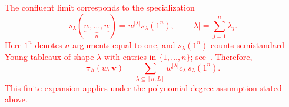 \documentclass[a4paper,11pt]{amsart}
\begin{document}
\textcolor{red}{The confluent limit corresponds to the specialization
\begin{equation}
  s_\lambda(\underbrace{w,\ldots,w}_{n})
  = w^{|\lambda|}s_\lambda(1^n),
  \qquad
  |\lambda|=\sum_{j=1}^n\lambda_j.
\end{equation}
Here \(1^n\) denotes \(n\) arguments equal to one, and
\(s_\lambda(1^n)\) counts semistandard Young tableaux of shape
\(\lambda\) with entries in \(\{1,\ldots,n\}\);
see~\cite{Stanley2023}. Therefore,
\begin{equation}
  \bm{\tau}_h(w,\bm{v})
  = \sum_{\lambda\subseteq[n,L]}
    w^{|\lambda|}c_\lambda\,s_\lambda(1^n).
\end{equation}
This finite expansion applies under the polynomial degree
assumption stated above.}

\end{document}
